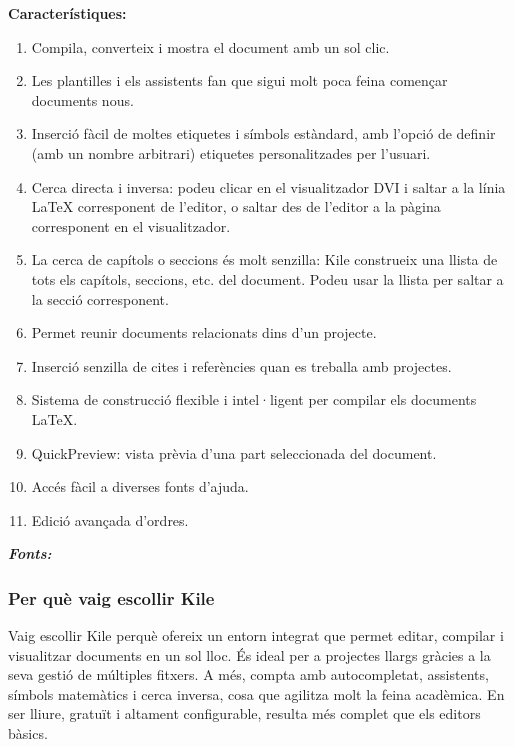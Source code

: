 \textbf{Característiques:}
\begin{enumerate}
 \item Compila, converteix i mostra el document amb un sol clic.
 \item Les plantilles i els assistents fan que sigui molt poca feina començar documents nous.
 \item Inserció fàcil de moltes etiquetes i símbols estàndard, amb l’opció de definir (amb un nombre arbitrari) etiquetes personalitzades per l’usuari.
 \item Cerca directa i inversa: podeu clicar en el visualitzador DVI i saltar a la línia LaTeX corresponent de l’editor, o saltar des de l’editor a la pàgina corresponent en el visualitzador.
 \item La cerca de capítols o seccions és molt senzilla: Kile construeix una llista de tots els capítols, seccions, etc. del document. Podeu usar la llista per saltar a la secció corresponent.
 \item Permet reunir documents relacionats dins d’un projecte.
 \item Inserció senzilla de cites i referències quan es treballa amb projectes.
 \item Sistema de construcció flexible i intel·ligent per compilar els documents LaTeX.
 \item QuickPreview: vista prèvia d’una part seleccionada del document.
 \item Accés fàcil a diverses fonts d’ajuda.
 \item Edició avançada d’ordres.
\end{enumerate}
\textit{\textbf{Fonts:}} \cite{KDE}

\subsubsection*{Per què vaig escollir Kile}
Vaig escollir Kile perquè ofereix un entorn integrat que permet editar, compilar i visualitzar documents en un sol lloc. És ideal per a projectes llargs gràcies a la seva gestió de múltiples fitxers.
A més, compta amb autocompletat, assistents, símbols matemàtics i cerca inversa, cosa que agilitza molt la feina acadèmica. En ser lliure, gratuït i altament configurable, resulta més complet que els editors bàsics.


